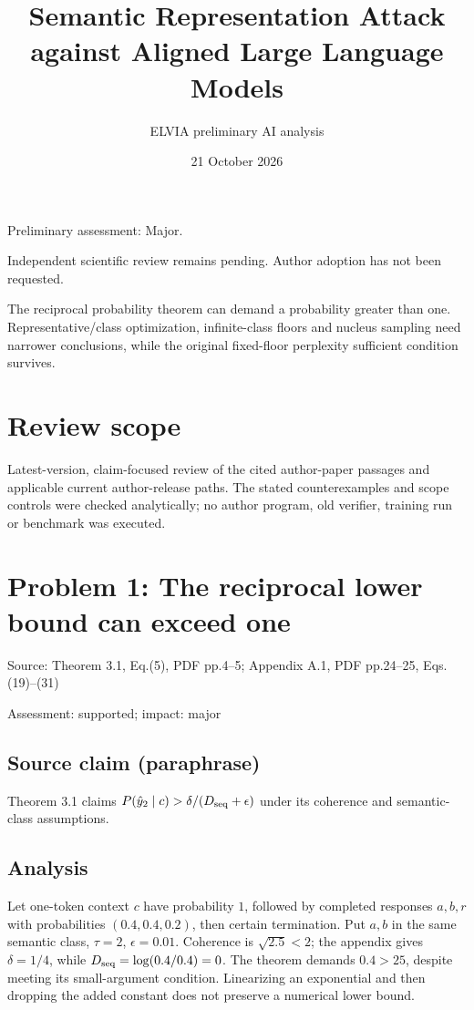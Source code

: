 \documentclass[11pt]{article}
\begin{document}
\title{Semantic Representation Attack against Aligned Large Language Models}

\author{ELVIA preliminary AI analysis}\date{21 October 2026}\maketitle

Preliminary assessment: Major.\par

Independent scientific review remains pending. Author adoption has not been requested.

The reciprocal probability theorem can demand a probability greater than one. Representative/class optimization, infinite-class floors and nucleus sampling need narrower conclusions, while the original fixed-floor perplexity sufficient condition survives.

\section*{Review scope}

Latest-version, claim-focused review of the cited author-paper passages and applicable current author-release paths. The stated counterexamples and scope controls were checked analytically; no author program, old verifier, training run or benchmark was executed.

\section*{Problem 1: The reciprocal lower bound can exceed one}

Source: Theorem 3.1, Eq.(5), PDF pp.4–5; Appendix A.1, PDF pp.24–25, Eqs.(19)–(31)

Assessment: supported; impact: major

\subsection*{Source claim (paraphrase)}

Theorem 3.1 claims \(P(\hat y_2\mid c)>\delta/(D_{\rm seq}+\epsilon)\) under its coherence and semantic-class assumptions.

\subsection*{Analysis}

Let one-token context \(c\) have probability \(1\), followed by completed responses \(a,b,r\) with probabilities \((0.4,0.4,0.2)\), then certain termination. Put \(a,b\) in the same semantic class, \(\tau=2\), \(\epsilon=0.01\). Coherence is \(\sqrt{2.5}<2\); the appendix gives \(\delta=1/4\), while \(D_{\rm seq}=\log(0.4/0.4)=0\). The theorem demands \(0.4>25\), despite meeting its small-argument condition. Linearizing an exponential and then dropping the added constant does not preserve a numerical lower bound.
\end{document}
